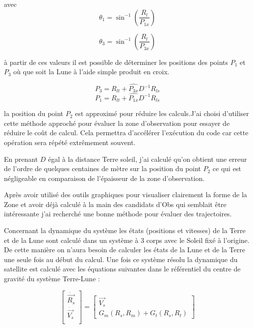 \documentclass[12pt]{article} %
\begin{document}
		avec
		$$
		\theta_1=\sin^{-1}\left(\frac{R_l}{P_{1x}}\right)
		$$
		
		$$
		\theta_3=\sin^{-1}\left(\frac{R_l}{P_{3x}}\right)
		$$
		
		à partir de ces valeurs il est possible de déterminer les positions des points $P_1$ et $P_3$ où que soit la Lune à l'aide simple produit en croix.
		
		$$
		\begin{equation}
			P_3=R_{lt}+\hat{P_{3x}}D^{-1}R_{ls} 
		\end{equation}
		$$
		$$
		\begin{equation}
			P_1=R_{lt}+\hat{P_{1x}}D^{-1}R_{ls} 
		\end{equation}
		$$
		
		la position du point $P_2$ est approximé pour réduire les calculs.J'ai choisi d'utiliser cette méthode approché pour évaluer la zone d'observation pour essayer de réduire le coût de calcul. Cela permettra d'accélérer l'exécution du code car cette opération sera répété extrêmement souvent.
		
		En prenant $D$ égal à la distance Terre soleil, j'ai calculé qu'on obtient une erreur de l'ordre de quelques centaines de mètre sur la position du point $P_2$ ce qui est négligeable en comparaison de l'épaisseur de la zone d'observation.
		
		Après avoir utilisé des outils graphiques pour visualiser clairement la forme de la \gls{Zone} et avoir déjà calculé à la main des candidats d'\gls{Obs} qui semblait être intéressante j'ai recherché une bonne méthode pour évaluer des trajectoires.
		
		Concernant la dynamique du système les états (positions et vitesses) de la Terre et de la Lune sont calculé dans un système à 3 corps avec le Soleil fixé à l'origine. De cette manière on n'aura besoin de calculer les états de la Lune et de la Terre une seule fois au début du calcul. Une fois ce système résolu la dynamique du satellite est calculé avec les équations suivantes dans le référentiel du centre de gravité du système Terre-Lune :
		
		$$
		\begin{bmatrix}
			\dot{\overrightarrow{R_{s}}}\\
			\dot{\overrightarrow{V_{s}}}\\
		\end{bmatrix} =\begin{bmatrix}
			\overrightarrow{V_{s}}\\
			G_{m}(R_s,R_m)+G_{t}(R_s,R_t)
		\end{bmatrix}
		$$
		
\end{document}
